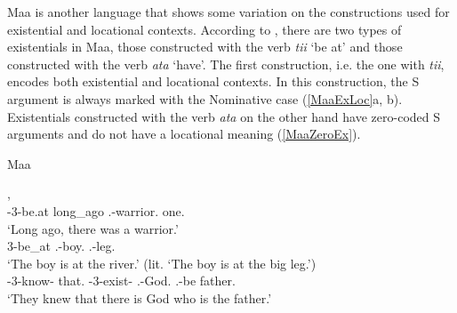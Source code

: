 Maa is another language that shows some variation on the constructions used for existential and locational contexts. 
According to \citet{Payne:2007}, there are two types of existentials in Maa, those constructed with the verb \emph{tii} `be at' and those constructed with the verb \emph{ata} `have'. %
The first construction, i.e. the one with \emph{tii}, encodes both existential and locational contexts. 
In this construction, the S argument is always marked with the  Nominative case (\ref{MaaExLoc}a, b).
Existentials constructed with the verb \emph{ata} on the other hand have zero-coded S arguments and do not have a locational meaning (\ref{MaaZeroEx}).


\begin{exe}
 \ex\label{MaaExLoc} {Maa} \citep[Nilotic; Kenya; ][ex.19a, ex.17, ex.20a] {Payne:2007}\nopagebreak[4]
\begin{xlist}
\ex\gll {} , \textbf{} \textbf{}\\
\con{}-3-be.at long\_ago \mas{}.\sg{}-warrior.\nom{} one.\nom{}\\
\glt `Long ago, there was a warrior.'
\ex\gll{} \textbf{} \\
3-be\_at \fem{}.\sg{}-boy.\nom{} \mas{}.\sg{}-leg.\acc{}\\
\glt `The boy is at the river.' (lit. `The boy is at the big leg.')
\ex\label{MaaZeroEx} \gll {}     \textbf{}  \\
\con{}-3-know-\incep{} that.\pl{} \dscn{}-3-exist-\pass{} \fem{}.\sg{}-God.\acc{} \relativ{}.\fem{}-be father.\acc{}\\
\glt `They knew that there is God who is the father.'
\end{xlist}
\end{exe}


